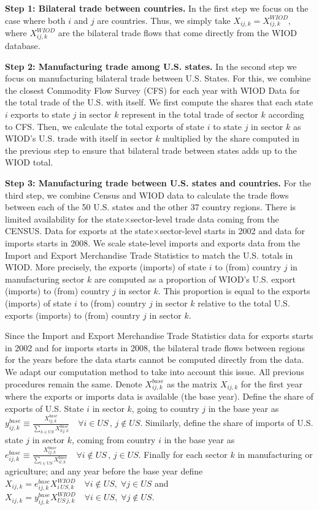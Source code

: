 \documentclass[12pt]{article}
\begin{document}
\textbf{Step 1: Bilateral trade between countries.} In the first step we focus on the case where both $i$ and $j$ are countries. Thus, we simply take $X_{ij,k}=X_{ij,k}^{WIOD}$, where $X_{ij,k}^{WIOD}$ are the bilateral trade flows that come directly from the WIOD database.

\textbf{Step 2: Manufacturing trade among U.S. states.} In the second step we focus on manufacturing bilateral trade between U.S. States. For this, we combine the closest Commodity Flow Survey (CFS) for each year with WIOD Data for the total trade of the U.S. with itself. We first compute the shares that each state $i$ exports to state $j$ in sector $k$ represent in the total trade of sector $k$ according to CFS. Then, we calculate the total exports of state $i$ to state $j$ in sector $k$ as WIOD's U.S. trade with itself in sector $k$ multiplied by the share computed in the previous step to ensure that bilateral trade between states adds up to the WIOD total.

\textbf{Step 3: Manufacturing trade between U.S. states and countries.} For the third step, we combine Census and WIOD data to calculate the trade flows between each of the 50 U.S. states and the other 37 country regions. There is limited availability for the state$\times$sector-level trade data coming from the  CENSUS. Data for exports at the state$\times$sector-level starts in 2002 and data for imports starts in 2008. We scale state-level imports and exports data from the Import and Export Merchandise Trade Statistics to match the U.S. totals in WIOD. More precisely, the exports (imports) of state $i$ to (from) country $j$ in manufacturing sector $k$ are computed as a proportion of WIOD's U.S. export (imports) to (from) country $j$ in sector $k$. This proportion is equal to the exports (imports) of state $i$ to (from) country $j$ in sector $k$ relative to the total U.S. exports (imports) to (from) country $j$ in sector $k$.

Since the Import and Export Merchandise Trade Statistics data for exports starts in 2002 and for imports starts in 2008, the bilateral trade flows between regions for the years before the data starts cannot be computed directly from the data. We adapt our computation method to take into account this issue. All previous procedures remain the same. Denote $X_{ij,k}^{base}$ as the matrix $X_{ij,k}$ for the first year where the exports or imports data is available (the base year). Define the share of exports of U.S. State $i$ in sector $k$, going to country $j$ in the base year as $y_{ij,k}^{base}\equiv\tfrac{X_{ij,k}^{base}}{\sum_{h\in US}X_{hj,k}^{base}} \quad \forall i\in US \, , \, j\notin US.$ Similarly, define the share of imports of U.S. state $j$ in sector $k$, coming from country $i$ in the base year as $e_{ij,k}^{base}\equiv\tfrac{X_{ij,k}^{base}}{\sum_{l\in US}X_{il,k}^{base}} \quad \forall i\notin US \, , \, j\in US.$ Finally for each sector $k$ in manufacturing or agriculture; and any year before the base year define $X_{ij,k}= e_{ij,k}^{base}X_{i\,US,k}^{WIOD} \quad \forall i\notin US, \; \forall j\in US$ and $X_{ij,k}=y_{ij,k}^{base}X_{US\,j,k}^{WIOD} \quad \forall i\in US, \; \forall j\notin US$.
\end{document}
